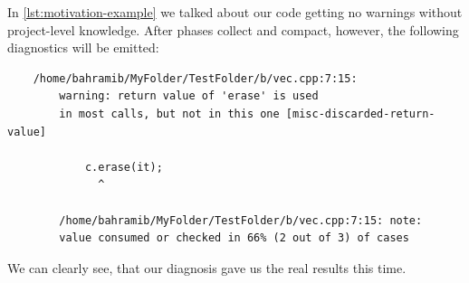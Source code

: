 In \cref{lst:motivation-example} we talked about our code getting no warnings without project-level knowledge.
After phases collect and compact, however, the following diagnostics will be emitted:

\begin{listing}[H]
	\begin{verbatim}
	/home/bahramib/MyFolder/TestFolder/b/vec.cpp:7:15:
		warning: return value of 'erase' is used
		in most calls, but not in this one [misc-discarded-return-value]

			c.erase(it);
			  ^

		/home/bahramib/MyFolder/TestFolder/b/vec.cpp:7:15: note:
		value consumed or checked in 66% (2 out of 3) of cases
	\end{verbatim}
\end{listing}

We can clearly see, that our diagnosis gave us the real results this time.

